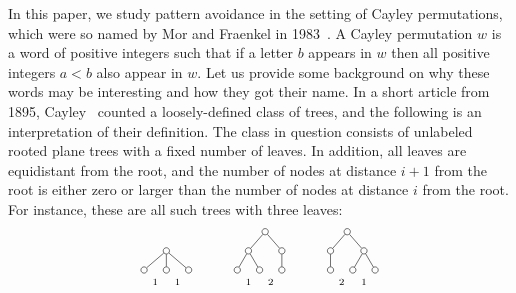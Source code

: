 \documentclass[a4paper, 11pt]{article}
\theoremstyle{definition}
\begin{document}
In this paper, we study pattern avoidance in the setting of Cayley
permutations, which were so named by Mor and Fraenkel in
1983~\cite{MorFraenkel1984}. A Cayley permutation $w$ is a word of
positive integers such that if a letter $b$ appears in $w$ then all
positive integers $a<b$ also appear in $w$. Let us provide some
background on why these words may be interesting and how they got their
name. In a short article from 1895, Cayley~\cite{Cayley1859} counted a
loosely-defined class of trees, and the following is an interpretation
of their definition. The class in question consists of unlabeled rooted
plane trees with a fixed number of leaves. In addition, all leaves are
equidistant from the root, and the number of nodes at distance $i+1$
from the root is either zero or larger than the number of nodes at
distance $i$ from the root. For instance, these are all such trees with three
leaves:
\[
\begin{tikzpicture}[
  scale=0.8,
  level distance=4ex,
  level 1/.style={sibling distance=2em},
  ]
  \begin{scope}[every node/.style = {draw, circle, inner sep=1.6pt}]
  \node {}
    child {node (a) {}}
    child {node (b) {}}
    child {node (c) {}};
  \end{scope}
  \path (a) -- (b) node[midway, yshift=-2ex] {$\scriptstyle 1$};
  \path (b) -- (c) node[midway, yshift=-2ex] {$\scriptstyle 1$};
\end{tikzpicture}\qquad\quad
\begin{tikzpicture}[
  scale=0.8,
  level distance=4ex,
  level 1/.style={sibling distance=3em},
  level 2/.style={sibling distance=2em}
  ]
  \begin{scope}[every node/.style = {draw, circle, inner sep=1.6pt}]
  \node {}
    child {node {}
      child {node (a) {}}
      child {node (b) {}}
    }
    child {node {}
      child {node (c) {}}
    };
  \end{scope}
  \path (a) -- (b) node[midway, yshift=-2ex] {$\scriptstyle 1$};
  \path (b) -- (c) node[midway, yshift=-2ex] {$\scriptstyle 2$};
\end{tikzpicture}\qquad\quad
\begin{tikzpicture}[
  scale=0.8,
  level distance=4ex,
  level 1/.style={sibling distance=3em},
  level 2/.style={sibling distance=2em}
  ]
  \begin{scope}[every node/.style = {draw, circle, inner sep=1.6pt}]
  \node {}
    child {node {}
      child {node (a) {}}
    }
    child {node {}
      child {node (b) {}}
      child {node (c) {}}
    };
  \end{scope}
  \path (a) -- (b) node[midway, yshift=-2ex] {$\scriptstyle 2$};
  \path (b) -- (c) node[midway, yshift=-2ex] {$\scriptstyle 1$};
\end{tikzpicture}\vspace{-1.5ex}
\]
\end{document}
